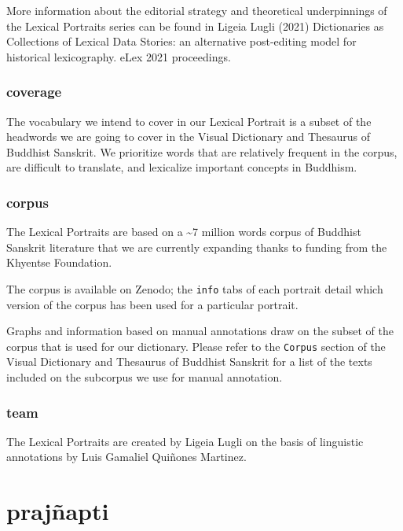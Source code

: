\documentclass[
  letterpaper,
  DIV=11,
  numbers=noendperiod,
  oneside]{scrreprt}
\begin{document}
More information about the editorial strategy and theoretical
underpinnings of the Lexical Portraits series can be found in Ligeia
Lugli (2021) Dictionaries as Collections of Lexical Data Stories: an
alternative post-editing model for historical lexicography. eLex 2021
proceedings.

\hypertarget{coverage}{%
\subsection{coverage}\label{coverage}}

The vocabulary we intend to cover in our Lexical Portrait is a subset of
the headwords we are going to cover in the Visual Dictionary and
Thesaurus of Buddhist Sanskrit. We prioritize words that are relatively
frequent in the corpus, are difficult to translate, and lexicalize
important concepts in Buddhism.

\hypertarget{corpus}{%
\subsection{corpus}\label{corpus}}

The Lexical Portraits are based on a \textasciitilde7 million words
corpus of Buddhist Sanskrit literature that we are currently expanding
thanks to funding from the Khyentse Foundation.

The corpus is available on Zenodo; the \texttt{info} tabs of each
portrait detail which version of the corpus has been used for a
particular portrait.

Graphs and information based on manual annotations draw on the subset of
the corpus that is used for our dictionary. Please refer to the
\texttt{Corpus} section of the Visual Dictionary and Thesaurus of
Buddhist Sanskrit for a list of the texts included on the subcorpus we
use for manual annotation.

\hypertarget{team}{%
\subsection{team}\label{team}}

The Lexical Portraits are created by Ligeia Lugli on the basis of
linguistic annotations by Luis Gamaliel Quiñones Martinez.


\hypertarget{prajuxf1apti}{%
\chapter{prajñapti}\label{prajuxf1apti}}
\end{document}
